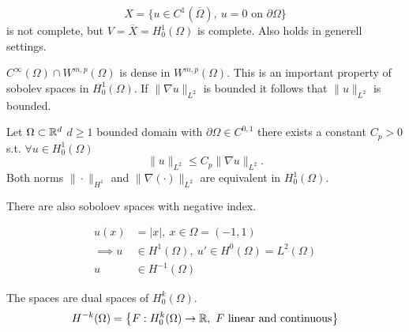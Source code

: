 \begin{example}
	\begin{equation*}
	X= \big \{ u \in C^1(\overline{\Omega}), \ u=0 \text{ on } \partial\Omega  \big \}
	\end{equation*}
	is not complete, but $V = \overline{X} = H^1_0(\Omega)$ is complete. Also holds in  generell settings.\\
\end{example}

\par
 $C^\infty(\Omega)\cap W^{m,p}(\Omega)$ is dense in $ W^{m,p}(\Omega)$.
This is an important property of sobolev spaces in $H^1_0(\Omega)$. \enter
If $\|\nabla u \|_{L^2}$ is bounded it follows that $\|u \|_{L^2}$ is bounded.

\begin{theorem}
	Let $\Omega \subset \mathbb{R}^d$ $d\geq 1$ bounded domain with $\partial \Omega \in C^{0,1}$ there exists a constant $C_p > 0$ s.t. $\forall u\in H^1_0(\Omega)$
	\begin{equation*}
		\|u\|_{L^2} \leq C_p \|\nabla u\|_{L^2}.
	\end{equation*}
	Both norms $\|\cdot\|_{H^1}$ and $ \|\nabla(\cdot)\|_{L^2} $ are equivalent in $H^1_0(\Omega)$.
\end{theorem}
 
There are also soboloev spaces with negative index.\enter

\begin{example}
	\begin{align*}
	u(x) &= |x|, \ x\in \Omega = (-1,1)\\
	\implies u&\in H^1(\Omega),\ u' \in H^0(\Omega) = L^2(\Omega)\\
	u &\in H^{-1}(\Omega)
	\end{align*}
\end{example}


The spaces are dual spaces of $H^k_0(\Omega)$.
\begin{equation*}
	H^{-k}(\Omega) = \big \{ F: H^k_0(\Omega) \to \mathbb{R},\  F \text{ linear and continuous} \big \}
\end{equation*}


